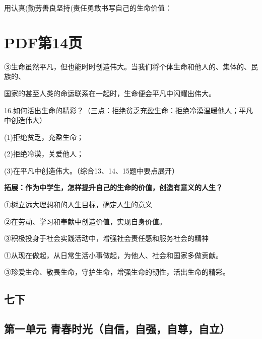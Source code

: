 \documentclass[lang=cn,11pt]{elegantbook}
\newcommand{\daofasym}[1]{{\daofasymbolfont #1}}
\newcommand{\daofasym}[1]{#1}
\begin{document}
用认真(勤劳善良坚持(责任勇敢书写自己的生命价值：\par


\section*{PDF第14页}

\daofasym{③}生命虽然平凡，但也能时时创造伟大。当我们将个体生命和他人的、集体的、民族的、\par

国家的甚至人类的命运联系在一起时，生命便会平凡中闪耀出伟大。\par

16.如何活出生命的精彩？（三点：拒绝贫乏充盈生命：拒绝冷漠温暖他人；平凡中创造伟大）\par

(1)拒绝贫乏，充盈生命；\par

(2)拒绝冷漠，关爱他人；\par

(3)在平凡中创造伟大。（综合13、14、15题中要点展开）\par

\textbf{拓展：作为中学生，怎样提升自己的生命的价值，创造有意义的人生？}\par

\daofasym{①}树立远大理想和的人生目标，确定人生的意义\par

\daofasym{②}在劳动、学习和奉献中创造价值，实现自身价值。\par

\daofasym{③}积极投身于社会实践活动中，增强社会责任感和服务社会的精神\par

\daofasym{①}从现在做起，从日常生活小事做起，为他人、社会和国家多做贡献。\par

\daofasym{③}珍爱生命、敬畏生命，守护生命，增强生命的韧性，活出生命的精彩。\par

\subsection*{七下}

\subsection*{第一单元 青春时光（自信，自强，自尊，自立）}
\end{document}
